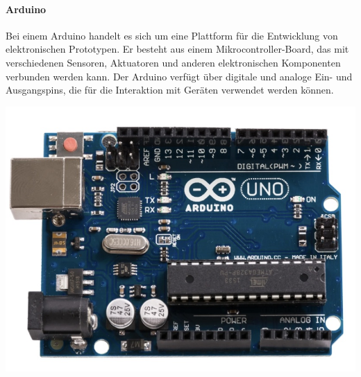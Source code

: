 \begin{minipage}{0.7\textwidth}
	\paragraph{Arduino}
	Bei einem Arduino handelt es sich um eine Plattform für die Entwicklung von elektronischen Prototypen.
	Er besteht aus einem Mikrocontroller-Board, das mit verschiedenen Sensoren, Aktuatoren und anderen elektronischen Komponenten verbunden werden kann.
	Der Arduino verfügt über digitale und analoge Ein- und Ausgangspins, die für die Interaktion mit Geräten verwendet werden können.
\end{minipage}
\begin{minipage}{0.3\textwidth}
	\includegraphics [width=\textwidth] {img/ArduinoR3}
\end{minipage}
\newline

